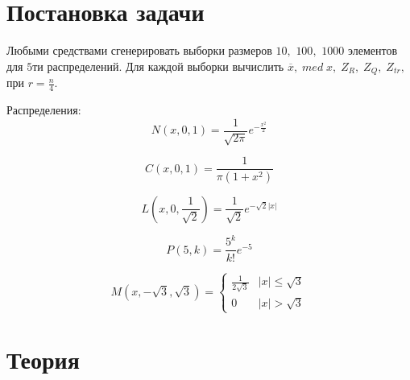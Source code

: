 \documentclass[a4]{article}
\renewcommand{\listoftables}{\begingroup %
\tocsection
\tocfile{\listtablename}{lot}
\endgroup}
\begin{document}


\newpage
\tableofcontents{}
\newpage
\listoftables{}
\newpage

\section{Постановка задачи}

Любыми средствами сгенерировать выборки размеров $10,$ $100,$ $1000$ элементов для $5$ти распределений. Для каждой выборки вычислить $\overline{x},\; med\; x,\; Z_R,\; Z_Q,\; Z_{tr},$ при $r = \frac{n}{4}.$

Распределения:
\begin{equation}\label{eqn:normal}
N(x,0,1) = \frac{1}{\sqrt{2\pi}}e^{-\frac{x^2}{2}}
\end{equation} 

\begin{equation}\label{eqn:cauchy}
C(x,0,1) = \frac{1}{\pi(1+x^2)}
\end{equation}

\begin{equation}\label{eqn:laplace}
L\left( x,0,\frac{1}{\sqrt{2}}\right) = \frac{1}{\sqrt{2}}e^{-\sqrt{2}\vert x\vert}
\end{equation}

\begin{equation}\label{eqn:poisson}
P(5,k) = \frac{5^k}{k!}e^{-5}
\end{equation}  

\begin{equation}\label{eqn:uniform}
M(x,-\sqrt{3}, \sqrt{3}) = 
\begin{cases}
\frac{1}{2\sqrt{3}} &\vert x\vert \leqslant \sqrt{3}\\
0 &\vert x\vert > \sqrt{3}
\end{cases}
\end{equation}
\section{Теория}
\end{document}
